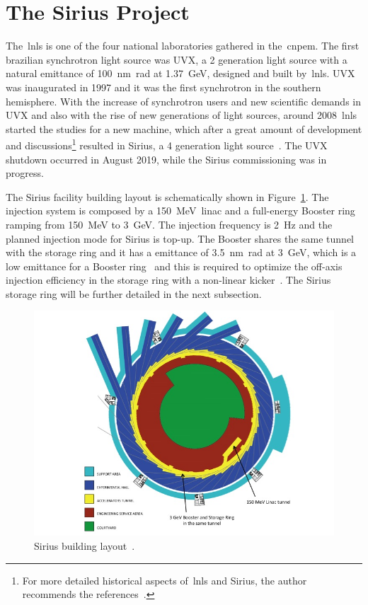 \section{The Sirius Project}\label{sec:sirius_project}
The~\gls{lnls} is one of the four national laboratories gathered in the~\gls{cnpem}. The first brazilian synchrotron light source was UVX, a 2 generation light source with a natural emittance of \SI{100}{\nano\meter\radian} at \SI{1.37}{\giga\electronvolt}, designed and built by~\gls{lnls}. UVX was inaugurated in 1997 and it was the first synchrotron in the southern hemisphere. With the increase of synchrotron users and new scientific demands in UVX and also with the rise of new generations of light sources, around 2008~\gls{lnls} started the studies for a new machine, which after a great amount of development and discussions\footnote{For more detailed historical aspects of~\gls{lnls} and Sirius, the author recommends the references~\cite{liu2019, aldo2019}.} resulted in Sirius, a 4 generation light source~\cite{liu2014}. The UVX shutdown occurred in August 2019, while the Sirius commissioning was in progress.

The Sirius facility building layout is schematically shown in Figure~\ref{fig:sirius_building}. The injection system is composed by a \SI{150}{\mega\electronvolt}~\gls{linac} and a full-energy Booster ring ramping from \SI{150}{\mega\electronvolt} to \SI{3}{\giga\electronvolt}. The injection frequency is \SI{2}{\hertz} and the planned injection mode for Sirius is top-up. The Booster shares the same tunnel with the storage ring and it has a emittance of \SI{3.5}{\nano\meter\radian} at \SI{3}{\giga\electronvolt}, which is a low emittance for a Booster ring~\cite{sa2014a} and this is required to optimize the off-axis injection efficiency in the storage ring with a non-linear kicker~\cite{liu2016a}. The Sirius storage ring will be further detailed in the next subsection.
\begin{figure}
    \centering
    \includegraphics[scale=0.5]{figures/sirius_building.jpg}
    \caption{Sirius building layout~\cite{wiki}.}
    \label{fig:sirius_building}
\end{figure}
